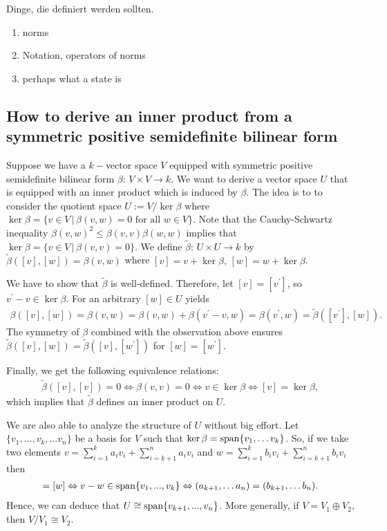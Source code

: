 Dinge, die definiert werden sollten. 
\begin{enumerate}
	\item norms
	\item Notation, operators of norms 
	\item  perhaps what a state is 
\end{enumerate}


\subsection{How to derive an inner product from a symmetric positive semidefinite bilinear form}
Suppose we have a $ k- $vector space $ V $ equipped with symmetric positive semidefinite bilinear form $ \beta: \, V \times V \to k $. We want to derive a vector space $ U $ that is equipped with an inner product which is induced by $ \beta $. The idea is to to consider the quotient space $ U:=V/\ker\beta $ where $ \ker \beta = \{ v \in V \, | \, \beta(v,w)= 0 \text{ for all } w \in V \} $. Note that the Cauchy-Schwartz inequality $ \beta(v,w)^2 \le \beta(v,v)\beta(w,w) $ implies that 
$ \ker \beta = \{ v \in V \, | \, \beta(v,v)= 0 \} $.
We define $ \tilde{\beta}:  \, U \times U \to k $ by $ \tilde{\beta}([v],[w]) = \beta(v,w) $ where $ [v] = v + \ker\beta, \,$$[w]=w+\ker\beta$.

We have to show that $ \tilde{\beta} $ is well-defined. Therefore, let $ [v]=[v^{\prime}] $, so $v^{\prime}-v \in \ker \beta $. 
For an arbitrary $ [w] \in U $ yields 
\begin{align*}
	\beta([v],[w]) = \beta(v,w) = \beta(v,w)+\beta(v^{\prime}-v,w)= \beta(v^{\prime},w) = \tilde{\beta}([v^{\prime}],[w]).
\end{align*}
The symmetry of $ \beta $ combined with the observation above ensures $ \tilde{\beta}([v],[w]) = \tilde{\beta}([v],[w^{\prime}]) $ for $ [w]= [w^{\prime}] $.

Finally, we get the following equivalence relations: 
\begin{align*}
	\tilde{\beta}([v],[v]) = 0 \Leftrightarrow \beta(v,v) = 0 \Leftrightarrow v \in \ker \beta \Leftrightarrow [v]= \ker \beta,
\end{align*}
which implies that $ \tilde{\beta} $ defines an inner product on $ U $. 

We are also able to analyze the structure of $ U $ without big effort. Let $ \{ v_1,\hdots,v_k, \hdots v_n \} $ be a basis for $ V $ such that $ \ker \beta = \textup{span} \{ v_1,\hdots v_k \}$. So, if we take two elements 
$ v = \sum_{i=1}^{k}a_iv_i + \sum_{i=k+1}^{n}a_iv_i$ and $ w = \sum_{i=1}^{k}b_iv_i + \sum_{i=k+1}^{n}b_iv_i $ then 
\begin{align*}
	[v] = [w] \Leftrightarrow v-w \in \textup{span} \{  v_1,...,v_k \} \Leftrightarrow (a_{k+1},\hdots a_n) = (b_{k+1},\hdots b_n).
\end{align*} 
Hence, we can deduce that $ U \cong \textup{span} \{ v_{k+1},...,v_n \} $. More generally, if $ V = V_1 \oplus V_2 $, then $ V/V_1 \cong V_2 $.